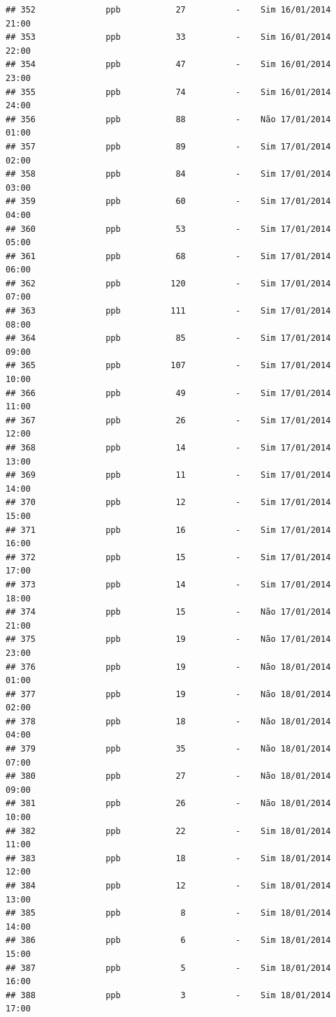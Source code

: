 \documentclass[]{book}
\begin{document}
\begin{verbatim}
## 352              ppb           27          -    Sim 16/01/2014 21:00
## 353              ppb           33          -    Sim 16/01/2014 22:00
## 354              ppb           47          -    Sim 16/01/2014 23:00
## 355              ppb           74          -    Sim 16/01/2014 24:00
## 356              ppb           88          -    Não 17/01/2014 01:00
## 357              ppb           89          -    Sim 17/01/2014 02:00
## 358              ppb           84          -    Sim 17/01/2014 03:00
## 359              ppb           60          -    Sim 17/01/2014 04:00
## 360              ppb           53          -    Sim 17/01/2014 05:00
## 361              ppb           68          -    Sim 17/01/2014 06:00
## 362              ppb          120          -    Sim 17/01/2014 07:00
## 363              ppb          111          -    Sim 17/01/2014 08:00
## 364              ppb           85          -    Sim 17/01/2014 09:00
## 365              ppb          107          -    Sim 17/01/2014 10:00
## 366              ppb           49          -    Sim 17/01/2014 11:00
## 367              ppb           26          -    Sim 17/01/2014 12:00
## 368              ppb           14          -    Sim 17/01/2014 13:00
## 369              ppb           11          -    Sim 17/01/2014 14:00
## 370              ppb           12          -    Sim 17/01/2014 15:00
## 371              ppb           16          -    Sim 17/01/2014 16:00
## 372              ppb           15          -    Sim 17/01/2014 17:00
## 373              ppb           14          -    Sim 17/01/2014 18:00
## 374              ppb           15          -    Não 17/01/2014 21:00
## 375              ppb           19          -    Não 17/01/2014 23:00
## 376              ppb           19          -    Não 18/01/2014 01:00
## 377              ppb           19          -    Não 18/01/2014 02:00
## 378              ppb           18          -    Não 18/01/2014 04:00
## 379              ppb           35          -    Não 18/01/2014 07:00
## 380              ppb           27          -    Não 18/01/2014 09:00
## 381              ppb           26          -    Não 18/01/2014 10:00
## 382              ppb           22          -    Sim 18/01/2014 11:00
## 383              ppb           18          -    Sim 18/01/2014 12:00
## 384              ppb           12          -    Sim 18/01/2014 13:00
## 385              ppb            8          -    Sim 18/01/2014 14:00
## 386              ppb            6          -    Sim 18/01/2014 15:00
## 387              ppb            5          -    Sim 18/01/2014 16:00
## 388              ppb            3          -    Sim 18/01/2014 17:00

\end{verbatim}
\end{document}
